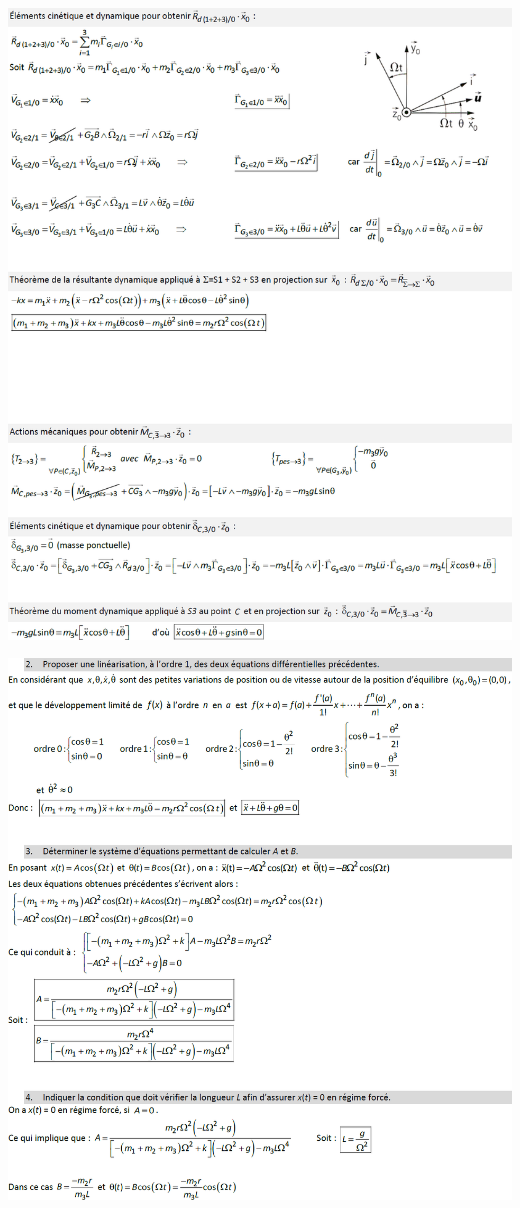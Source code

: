 \documentclass[10pt,fleqn]{article} %
\begin{document}
\begin{center}
\includegraphics[width=\linewidth]{images/cor_02}
\end{center}

\begin{center}
\includegraphics[width=\linewidth]{images/cor_03}
\end{center}
\end{document}
